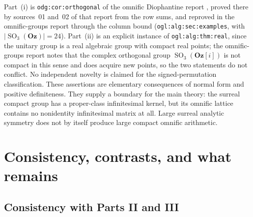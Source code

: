 \documentclass[11pt,letterpaper]{article}
\numberwithin{equation}{section}
\theoremstyle{definition}
\theoremstyle{remark}
\newcommand{\Oz}{\mathbf{Oz}}
\newcommand{\SO}{\operatorname{SO}}
\begin{document}
Part~(i) is \texttt{odg:cor:orthogonal} of the omnific Diophantine report
\cite{RepoODG}, proved there by sources~01 and~02 of that report from the row
sums, and reproved in the omnific-groups report through the column bound
(\texttt{ogl:alg:sec:examples}, with $|\SO_3(\Oz)|=24$). Part~(ii) is an explicit instance of
\texttt{ogl:alg:thm:real}, since the unitary group is a real algebraic group
with compact real points; the omnific-groups report notes that the complex
orthogonal group $\SO_3(\Oz[i])$ is not compact in this sense and does acquire
new points, so the two statements do not conflict. No independent novelty is
claimed for the signed-permutation classification. These assertions are
elementary consequences of normal form and positive definiteness. They supply a
boundary for the main theory: the surreal compact group has a proper-class
infinitesimal kernel, but its omnific lattice contains no nonidentity
infinitesimal matrix at all. Large surreal analytic symmetry does not by itself
produce large compact omnific arithmetic.

\section{Consistency, contrasts, and what remains}\label{e3:cpt:sec:scope}

\subsection{Consistency with Parts II and III}\label{e3:cpt:sub:consistency}
\end{document}
